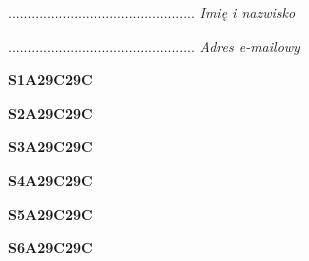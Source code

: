 \begin{turn}{90}\begin{minipage}{\linewidth} \vspace{20mm} ................................................  \textit{Imię i nazwisko}\end{minipage}\end{turn}

\begin{turn}{90}\begin{minipage}{\linewidth} \vspace{20mm} ................................................  \textit{Adres e-mailowy}\end{minipage}\end{turn}

\begin{turn}{90}\huge \begin{minipage}{\linewidth} \vspace{10mm}\textbf{S1A29C29C}\end{minipage}\end{turn}

\begin{turn}{90}\huge \begin{minipage}{\linewidth} \vspace{10mm}\textbf{S2A29C29C}\end{minipage}\end{turn}

\begin{turn}{90}\huge \begin{minipage}{\linewidth} \vspace{10mm}\textbf{S3A29C29C}\end{minipage}\end{turn}

\begin{turn}{90}\huge \begin{minipage}{\linewidth} \vspace{10mm}\textbf{S4A29C29C}\end{minipage}\end{turn}

\begin{turn}{90}\huge \begin{minipage}{\linewidth} \vspace{10mm}\textbf{S5A29C29C}\end{minipage}\end{turn}

\begin{turn}{90}\huge \begin{minipage}{\linewidth} \vspace{10mm}\textbf{S6A29C29C}\end{minipage}\end{turn}

